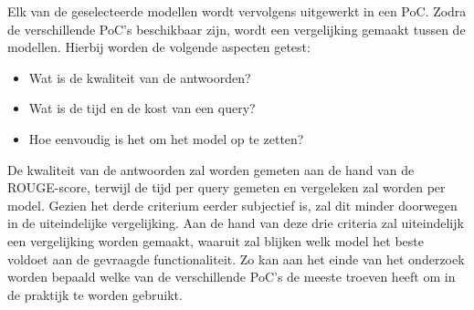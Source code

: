Elk van de geselecteerde modellen wordt vervolgens uitgewerkt in een PoC. Zodra de verschillende PoC’s beschikbaar zijn, wordt een vergelijking gemaakt tussen de modellen. Hierbij worden de volgende aspecten getest:

\begin{itemize} 
    \item Wat is de kwaliteit van de antwoorden? 
    \item Wat is de tijd en de kost van een query?
    \item Hoe eenvoudig is het om het model op te zetten? 
\end{itemize}

De kwaliteit van de antwoorden zal worden gemeten aan de hand van de ROUGE-score, terwijl de tijd per query gemeten en vergeleken zal worden per model. Gezien het derde criterium eerder subjectief is, zal dit minder doorwegen in de uiteindelijke vergelijking. Aan de hand van deze drie criteria zal uiteindelijk een vergelijking worden gemaakt, waaruit zal blijken welk model het beste voldoet aan de gevraagde functionaliteit. Zo kan aan het einde van het onderzoek worden bepaald welke van de verschillende PoC's de meeste troeven heeft om in de praktijk te worden gebruikt.


